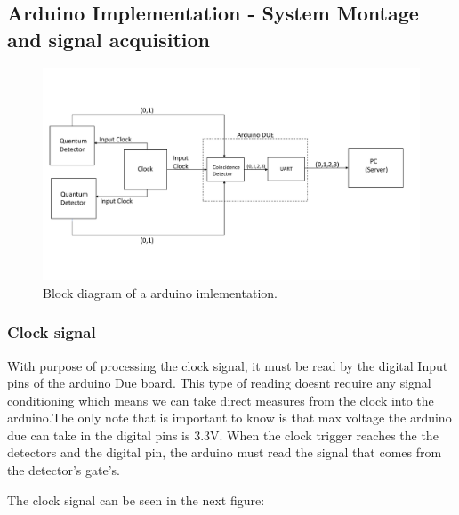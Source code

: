\begin{refsection}
\begin{itemize}
	\end{itemize}
	
	
	\subsection{Arduino Implementation - System Montage and signal acquisition}
	
	\begin{figure}[H]
		\centering
		\includegraphics[width=1.1\linewidth]{./sdf/arduino_quantum_rx/figures/DiagramaGeralArduino.pdf}
		\caption{Block diagram of a arduino imlementation.}
		\label{fig:netxpto}
	\end{figure}
	
	
	\vspace{15px}
	\subsubsection{Clock signal}
	
	With purpose of processing the clock signal, it must be read by the digital Input pins of the arduino Due board. This type of reading doesnt require any signal conditioning which means we can take direct measures from the clock into the arduino.The only note that is important to know is that max voltage the arduino due can take in the digital pins is 3.3V. When the clock trigger reaches the the detectors and the digital pin, the arduino must read the signal that comes from the detector's gate's.
	\vspace{15px}
	
   The clock signal can be seen in the next figure:
	

\end{refsection}
